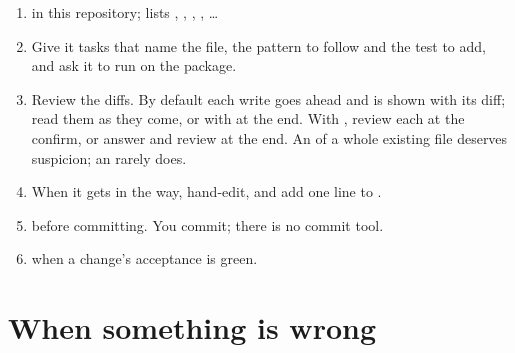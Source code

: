 \begin{enumerate}[leftmargin=2em]
\item {} in this repository;  lists
  , , , ,
  \ldots
\item Give it tasks that name the file, the pattern to follow and the test
  to add, and ask it to run  on the package.
\item Review the diffs. By default each write goes ahead and is shown
  with its diff; read them as they come, or with  at the
  end. With , review each at the confirm, or
  answer  and review at the end. An  of a whole
  existing file deserves suspicion; an  rarely does.
\item When it gets in the way, hand-edit, and add one line to
  .
\item {} before committing. You commit; there is no commit
  tool.
\item {} when a change's acceptance is green.
\end{enumerate}

\chapter{When something is wrong}

